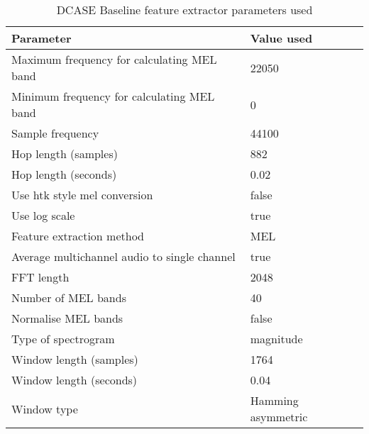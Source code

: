 \documentclass[11pt]{article}
\begin{document}
\begin{multicols}{2}
\begin{table}
\caption{DCASE Baseline feature extractor parameters used}
\label{label}
	\begin{tabular}{|l|l|}
		\hline
		Parameter 						& Value used \\ \hline
		Maximum frequency for calculating MEL band	& 22050 \\
		Minimum frequency for calculating MEL band	& 0	\\		
		Sample frequency				& 44100\\
		Hop length (samples)			&	882\\
		Hop length (seconds)			& 0.02\\
		Use htk style mel conversion	& false\\
		Use log scale					& true\\
		Feature extraction method		& MEL\\
		Average multichannel audio to single channel & true\\
		FFT length						& 2048\\
		Number of MEL bands				& 40\\
		Normalise MEL bands				& false\\
		Type of spectrogram				& magnitude\\
		Window length (samples)			& 1764\\
		Window length (seconds)			& 0.04\\
		Window type						& Hamming asymmetric
	\end{tabular}
\end{table}


\end{multicols}
\end{document}
